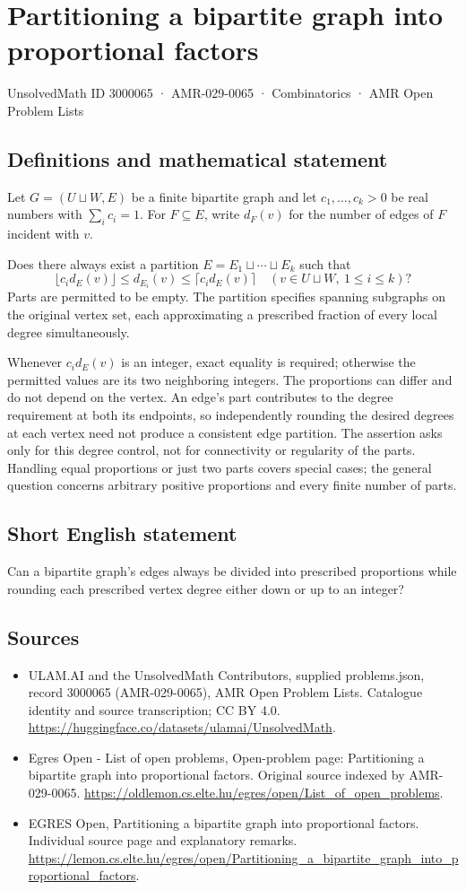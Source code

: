 \documentclass[11pt,a4paper]{article}
\begin{document}
\section*{Partitioning a bipartite graph into proportional factors}\label{3000065}
{\small UnsolvedMath ID 3000065 · AMR-029-0065 · Combinatorics · AMR Open Problem Lists}
\subsection{Definitions and mathematical statement}
Let $G=(U\sqcup W,E)$ be a finite bipartite graph and let
$c_1,\ldots,c_k>0$ be real numbers with $\sum_i c_i=1$.
For $F\subseteq E$, write $d_F(v)$ for the number of edges of $F$
incident with $v$.

Does there always exist a partition $E=E_1\sqcup\cdots\sqcup E_k$
such that
\[
                 \lfloor c_i d_E(v)\rfloor\le d_{E_i}(v)
                       \le\lceil c_i d_E(v)\rceil
                              \quad(v\in U\sqcup W,\ 1\le i\le k)?
\]
Parts are permitted to be empty. The partition specifies spanning
subgraphs on the original vertex set, each approximating a prescribed
fraction of every local degree simultaneously.

Whenever $c_i d_E(v)$ is an integer, exact equality is required;
otherwise the permitted values are its two neighboring integers.
The proportions can differ and do not depend on the vertex.
An edge's part contributes to the degree requirement at both its
endpoints, so independently rounding the desired degrees at each
vertex need not produce a consistent edge partition.
The assertion asks only for this degree control, not for connectivity
or regularity of the parts. Handling equal proportions or just two
parts covers special cases; the general question concerns arbitrary
positive proportions and every finite number of parts.
\subsection{Short English statement}
Can a bipartite graph's edges always be divided into prescribed
proportions while rounding each prescribed vertex degree either down or up to an integer?
\subsection{Sources}
\begin{itemize}
\item[S1] ULAM.AI and the UnsolvedMath Contributors, supplied problems.json, record 3000065 (AMR-029-0065), AMR Open Problem Lists. Catalogue identity and source transcription; CC BY 4.0.
\url{https://huggingface.co/datasets/ulamai/UnsolvedMath}.
\item[S2] Egres Open - List of open problems, Open-problem page: Partitioning a bipartite graph into proportional factors. Original source indexed by AMR-029-0065.
\url{https://oldlemon.cs.elte.hu/egres/open/List_of_open_problems}.
\item[S3] EGRES Open, Partitioning a bipartite graph into proportional factors. Individual source page and explanatory remarks.
\url{https://lemon.cs.elte.hu/egres/open/Partitioning_a_bipartite_graph_into_proportional_factors}.
\end{itemize}
\end{document}
